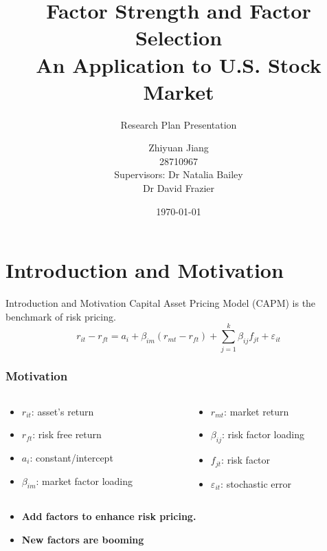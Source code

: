 \documentclass[12pt]{beamer}
\title{Factor Strength and Factor Selection\\
		\large
An Application to U.S. Stock Market }
\subtitle{Research Plan Presentation}
\date{\today}
\author[author]{Zhiyuan Jiang\\
			28710967\\[10mm]{\small Supervisors: Dr Natalia Bailey \\ \hspace{18.5mm} Dr David Frazier}}
\begin{document}
	
\frame[plain]{\titlepage}

\section{Introduction and Motivation}
\begin{frame}{Introduction and Motivation}
Capital Asset Pricing Model (CAPM) is the benchmark of risk pricing.
\[r_{it} - r_{ft} = a_i + \beta_{im}(r_{mt} - r_{ft}) + \sum_{j=1}^{k}\beta_{ij}f_{jt} + \varepsilon_{it} \]

\frametitle{Motivation}
\begin{columns}
	\begin{column}{0.5\textwidth}
\begin{itemize}
\item $r_{it}$: asset's return
\item $r_{ft}$: risk free return
\item $a_i$: constant/intercept
\item $\beta_{im}$: market factor loading
\end{itemize}
	\end{column}
	\begin{column}{0.5\textwidth}  %
		\begin{center}
\begin{itemize}
\item $r_{mt}$: market return 
\item$\beta_{ij}$: risk factor loading
\item $f_{jt}$: risk factor
\item $\varepsilon_{it}$: stochastic error
\end{itemize}
		\end{center}
	\end{column}
\end{columns}
\begin{itemize}
\item{\bf Add factors to enhance risk pricing.}
\item{\bf  New factors are booming }
\end{itemize}

\end{frame}
\end{document}
